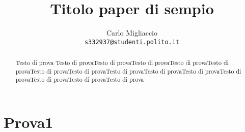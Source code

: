 \documentclass[10pt]{article}
\title{Titolo paper di sempio}
\author{
    Carlo Migliaccio\\
    {\tt s332937@studenti.polito.it}
}
\date{}
\begin{document}
\maketitle

\begin{abstract}
    Testo di prova
    Testo di provaTesto di provaTesto di provaTesto di provaTesto di provaTesto di provaTesto di provaTesto di provaTesto di provaTesto di provaTesto di provaTesto di provaTesto di provaTesto di prova
\end{abstract}

\section{Prova1}
\end{document}
